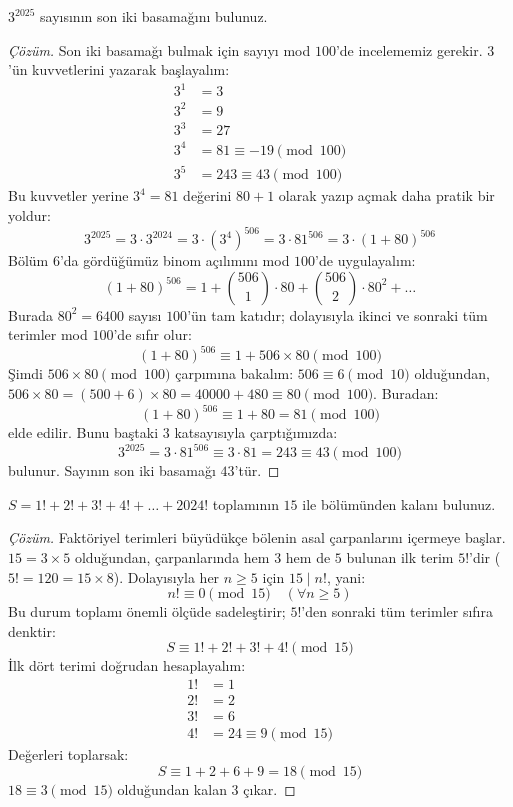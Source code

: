 \begin{example}
$3^{2025}$ sayısının son iki basamağını bulunuz.
\end{example}

\begin{proof}[Çözüm]
Son iki basamağı bulmak için sayıyı mod $100$'de incelememiz gerekir. $3$'ün kuvvetlerini yazarak başlayalım:
\begin{align*}
3^1 &= 3 \\
3^2 &= 9 \\
3^3 &= 27 \\
3^4 &= 81 \equiv -19 \pmod{100} \\
3^5 &= 243 \equiv 43 \pmod{100}
\end{align*}
Bu kuvvetler yerine $3^4 = 81$ değerini $80 + 1$ olarak yazıp açmak daha pratik bir yoldur:
\[
3^{2025} = 3 \cdot 3^{2024} = 3 \cdot (3^4)^{506} = 3 \cdot 81^{506} = 3 \cdot (1 + 80)^{506}
\]
Bölüm 6'da gördüğümüz binom açılımını mod $100$'de uygulayalım:
\[
(1 + 80)^{506} = 1 + \binom{506}{1} \cdot 80 + \binom{506}{2} \cdot 80^2 + \dots
\]
Burada $80^2 = 6400$ sayısı $100$'ün tam katıdır; dolayısıyla ikinci ve sonraki tüm terimler mod $100$'de sıfır olur:
\[
(1 + 80)^{506} \equiv 1 + 506 \times 80 \pmod{100}
\]
Şimdi $506 \times 80 \pmod{100}$ çarpımına bakalım:
$506 \equiv 6 \pmod{10}$ olduğundan, $506 \times 80 = (500 + 6) \times 80 = 40000 + 480 \equiv 80 \pmod{100}$.
Buradan:
\[
(1 + 80)^{506} \equiv 1 + 80 = 81 \pmod{100}
\]
elde edilir. Bunu baştaki $3$ katsayısıyla çarptığımızda:
\[
3^{2025} = 3 \cdot 81^{506} \equiv 3 \cdot 81 = 243 \equiv 43 \pmod{100}
\]
bulunur. Sayının son iki basamağı $43$'tür.
\end{proof}

\begin{example}
$S = 1! + 2! + 3! + 4! + \dots + 2024!$ toplamının $15$ ile bölümünden kalanı bulunuz.
\end{example}

\begin{proof}[Çözüm]
Faktöriyel terimleri büyüdükçe bölenin asal çarpanlarını içermeye başlar.
$15 = 3 \times 5$ olduğundan, çarpanlarında hem $3$ hem de $5$ bulunan ilk terim $5!$'dir ($5! = 120 = 15 \times 8$).
Dolayısıyla her $n \ge 5$ için $15 \mid n!$, yani:
\[
n! \equiv 0 \pmod{15} \quad (\forall n \ge 5)
\]
Bu durum toplamı önemli ölçüde sadeleştirir; $5!$'den sonraki tüm terimler sıfıra denktir:
\[
S \equiv 1! + 2! + 3! + 4! \pmod{15}
\]
İlk dört terimi doğrudan hesaplayalım:
\begin{align*}
1! &= 1 \\
2! &= 2 \\
3! &= 6 \\
4! &= 24 \equiv 9 \pmod{15}
\end{align*}
Değerleri toplarsak:
\[
S \equiv 1 + 2 + 6 + 9 = 18 \pmod{15}
\]
$18 \equiv 3 \pmod{15}$ olduğundan kalan $3$ çıkar.
\end{proof}

